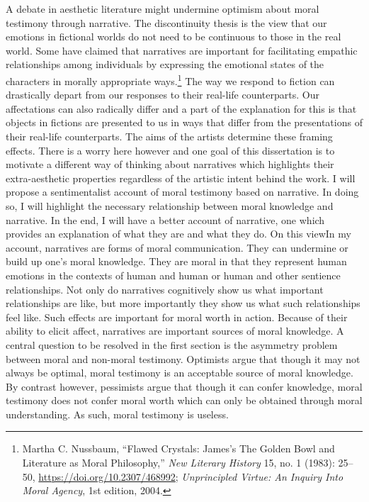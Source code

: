 \documentclass[phdthesis,12pt,final]{wuthesis}
\theoremstyle{definition}
\theoremstyle{definition}
\theoremstyle{definition}
\theoremstyle{definition}
\theoremstyle{remark}
\begin{document}
A debate in aesthetic literature might undermine optimism about moral testimony through narrative. The discontinuity thesis is the view that our emotions in fictional worlds do not need to be continuous to those in the real world. Some have claimed that narratives are important for facilitating empathic relationships among individuals by expressing the emotional states of the characters in morally appropriate ways.\footnote{Martha C. Nussbaum, {``Flawed {Crystals}: {James}'s {The Golden Bowl} and {Literature} as {Moral Philosophy},''} \emph{New Literary History} 15, no. 1 (1983): 25--50, \url{https://doi.org/10.2307/468992}; \emph{Unprincipled {Virtue}: {An Inquiry Into Moral Agency}}, 1st edition, 2004.} The way we respond to fiction can drastically depart from our responses to their real-life counterparts. Our affectations can also radically differ and a part of the explanation for this is that objects in fictions are presented to us in ways that differ from the presentations of their real-life counterparts. The aims of the artists determine these framing effects. There is a worry here however and one goal of this dissertation is to motivate a different way of thinking about narratives which highlights their extra-aesthetic properties regardless of the artistic intent behind the work. I will propose a sentimentalist account of moral testimony based on narrative. In doing so, I will highlight the necessary relationship between moral knowledge and narrative. In the end, I will have a better account of narrative, one which provides an explanation of what they are and what they do. On this viewIn my account, narratives are forms of moral communication. They can undermine or build up one's moral knowledge. They are moral in that they represent human emotions in the contexts of human and human or human and other sentience relationships. Not only do narratives cognitively show us what important relationships are like, but more importantly they show us what such relationships feel like. Such effects are important for moral worth in action. Because of their ability to elicit affect, narratives are important sources of moral knowledge. A central question to be resolved in the first section is the asymmetry problem between moral and non-moral testimony. Optimists argue that though it may not always be optimal, moral testimony is an acceptable source of moral knowledge. By contrast however, pessimists argue that though it can confer knowledge, moral testimony does not confer moral worth which can only be obtained through moral understanding. As such, moral testimony is useless.
\end{document}
